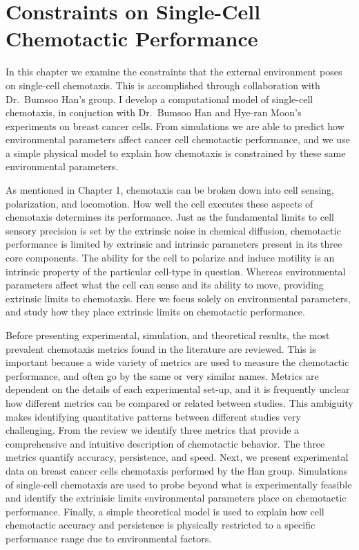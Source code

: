 
\chapter{Constraints on Single-Cell Chemotactic Performance}

In this chapter we examine the constraints that the external environment poses on single-cell chemotaxis. This is accomplished through collaboration with Dr.\ Bumsoo Han's group. I develop a computational model of single-cell chemotaxis, in conjuction with Dr.\ Bumsoo Han and Hye-ran Moon's experiments on breast cancer cells. From simulations we are able to predict how environmental parameters affect cancer cell chemotactic performance, and we use a simple physical model to explain how chemotaxis is constrained by these same environmental parameters.

As mentioned in Chapter 1, chemotaxis can be broken down into cell sensing, polarization, and locomotion. How well the cell executes these aspects of chemotaxis determines its performance. Just as the fundamental limits to cell sensory precision is set by the extrinsic noise in chemical diffusion, chemotactic performance is limited by extrinsic and intrinsic parameters present in its three core components. The ability for the cell to polarize and induce motility is an intrinsic property of the particular cell-type in question. Whereas environmental parameters affect what the cell can sense and its ability to move, providing extrinsic limits to chemotaxis. Here we focus solely on environmental parameters, and study how they place extrinsic limits on chemotactic performance.

Before presenting experimental, simulation, and theoretical results, the most prevalent chemotaxis metrics found in the literature are reviewed. This is important because a wide variety of metrics are used to measure the chemotactic performance, and often go by the same or very similar names. Metrics are dependent on the details of each experimental set-up, and it is frequently unclear how different metrics can be compared or related between studies. This ambiguity makes identifying quantitative patterns between different studies very challenging. From the review we identify three metrics that provide a comprehensive and intuitive description of chemotactic behavior.
The three metrics quantify accuracy, persistence, and speed. Next, we present experimental data on breast cancer cells chemotaxis performed by the Han group. Simulations of single-cell chemotaxis are used to probe beyond what is experimentally feasible and identify the extrinisic limits environmental parameters place on chemotactic performance. Finally, a simple theoretical model is used to explain how cell chemotactic accuracy and persistence is physically restricted to a specific performance range due to environmental factors.

